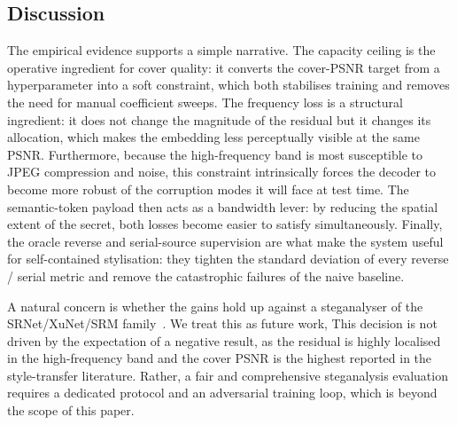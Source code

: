 \documentclass[conference]{IEEEtran}
\begin{document}
\subsection{Discussion}
The empirical evidence supports a simple narrative. The capacity ceiling is the operative ingredient for cover quality: it converts the cover-PSNR target from a hyperparameter into a soft constraint, which both stabilises training and removes the need for manual coefficient sweeps. The frequency loss is a structural ingredient: it does not change the magnitude of the residual but it changes its allocation, which makes the embedding less perceptually visible at the same PSNR. Furthermore, because the high-frequency band is most susceptible to JPEG compression and noise, this constraint intrinsically forces the decoder to become more robust of the corruption modes it will face at test time. The semantic-token payload then acts as a bandwidth lever: by reducing the spatial extent of the secret, both losses become easier to satisfy simultaneously. Finally, the oracle reverse and serial-source supervision are what make the system useful for self-contained stylisation: they tighten the standard deviation of every reverse / serial metric and remove the catastrophic failures of the naive baseline.

A natural concern is whether the gains hold up against a steganalyser of the SRNet/XuNet/SRM family~\cite{srnet,xunet,srm}. We treat this as future work, This decision is not driven by the expectation of a negative result, as the residual is highly localised in the high-frequency band and the cover PSNR is the highest reported in the style-transfer literature. Rather, a fair and comprehensive steganalysis evaluation requires a dedicated protocol and an adversarial training loop, which is beyond the scope of this paper.
\end{document}

